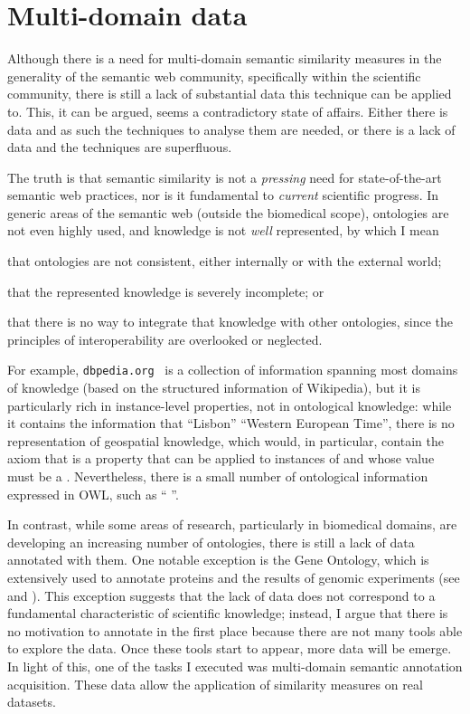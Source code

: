 \chapter{Multi-domain data} \label{chap:data}

Although there is a need for multi-domain semantic similarity measures in the generality of the semantic web community, specifically within the scientific community, there is still a lack of substantial data this technique can be applied to. This, it can be argued, seems a contradictory state of affairs. Either there is data and as such the techniques to analyse them are needed, or there is a lack of data and the techniques are superfluous.

The truth is that semantic similarity is not a \emph{pressing} need for state-of-the-art semantic web practices, nor is it fundamental to \emph{current} scientific progress. In generic areas of the semantic web (outside the biomedical scope), ontologies are not even highly used, and knowledge is not \emph{well} represented, by which I mean
\begin{paralist}
    \item that ontologies are not consistent, either internally or with the external world;
    \item that the represented knowledge is severely incomplete; or
    \item that there is no way to integrate that knowledge with other ontologies, since the principles of interoperability are overlooked or neglected.
\end{paralist}
For example, \texttt{dbpedia.org}~\citep{Bizer2009a} is a collection of information spanning most domains of knowledge (based on the structured information of Wikipedia), but it is particularly rich in instance-level properties, not in ontological knowledge: while it contains the information that ``Lisbon''  ``Western European Time'', there is no representation of geospatial knowledge, which would, in particular, contain the axiom that  is a property that can be applied to instances of  and whose value must be a . Nevertheless, there is a small number of ontological information expressed in OWL, such as ``  ''.

In contrast, while some areas of research, particularly in biomedical domains, are developing an increasing number of ontologies, there is still a lack of data annotated with them. One notable exception is the Gene Ontology, which is extensively used to annotate proteins and the results of genomic experiments (see  and ). This exception suggests that the lack of data does not correspond to a fundamental characteristic of scientific knowledge; instead, I argue that there is no motivation to annotate in the first place because there are not many tools able to explore the data. Once these tools start to appear, more data will be emerge. In light of this, one of the tasks I executed was multi-domain semantic annotation acquisition. These data allow the application of similarity measures on real datasets.

